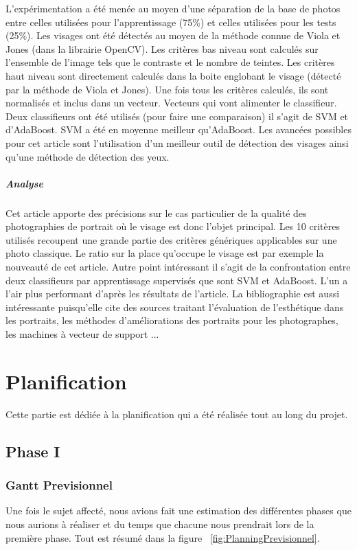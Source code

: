 \documentclass[11pt, french,screen]{report-rd-info}
\begin{document}
L'expérimentation a été menée au moyen d’une séparation de la base de photos entre celles utilisées pour l’apprentissage (75\%) et celles utilisées pour les tests (25\%). Les visages ont été détectés au moyen de la méthode connue de Viola et Jones (dans la librairie OpenCV).
Les critères bas niveau sont calculés sur l’ensemble de l’image tels que le contraste et le nombre de teintes. Les critères haut niveau sont directement calculés dans la boite englobant le visage (détecté par la méthode de Viola et Jones). Une fois tous les critères calculés, ils sont normalisés et inclus dans un vecteur. Vecteurs qui vont alimenter le classifieur. Deux classifieurs ont été utilisés (pour faire une comparaison) il s’agit de SVM et d’AdaBoost. SVM a été en moyenne meilleur qu’AdaBoost.
Les avancées possibles pour cet article sont l’utilisation d’un meilleur outil de détection des visages ainsi qu’une méthode de détection des yeux.
\paragraph{Analyse}
Cet article apporte des précisions sur le cas particulier de la qualité des photographies de portrait où le visage est donc l’objet principal. Les 10 critères utilisés recoupent une grande partie des critères génériques applicables sur une photo classique. Le ratio sur la place qu’occupe le visage est par exemple la nouveauté de cet article.
Autre point intéressant il s’agit de la confrontation entre deux classifieurs par apprentissage supervisés que sont SVM et AdaBoost. L’un a l’air plus performant d’après les résultats de l’article. La bibliographie est aussi intéressante puisqu’elle cite des sources traitant l’évaluation de l’esthétique dans les portraits, les méthodes d’améliorations des portraits pour les photographes, les machines à vecteur de support ...


\chapter{Planification}
Cette partie est dédiée à la planification qui a été réalisée tout au long du projet.

\section{Phase I}
\subsection{Gantt Previsionnel}
Une fois le sujet affecté, nous avions fait une estimation des différentes phases que nous aurions à réaliser et du temps que chacune nous prendrait lors de la première phase. Tout est résumé dans la figure ~\ref{fig:PlanningPrevisionnel}.
\end{document}
